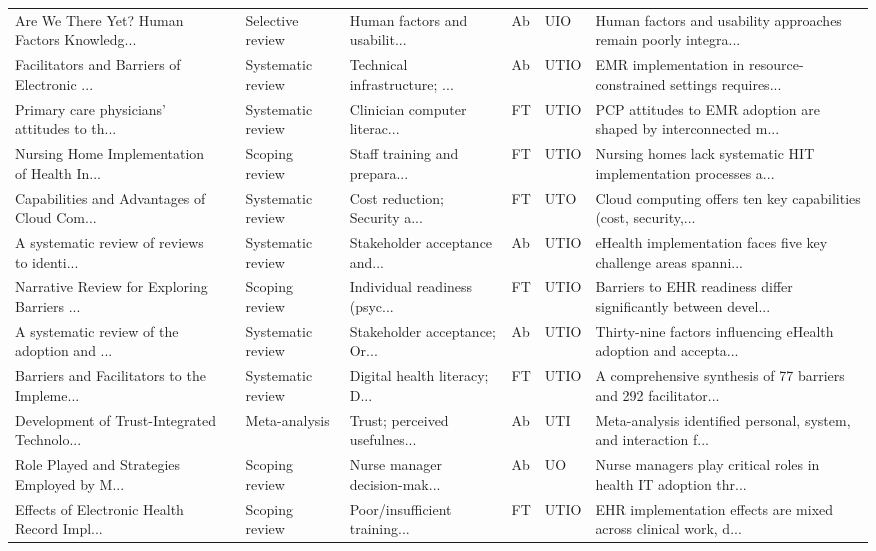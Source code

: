 \begin{longtable}{p{3.4cm} >{\centering\arraybackslash}p{0.7cm} p{1.9cm} p{2.4cm} >{\centering\arraybackslash}p{0.8cm} >{\centering\arraybackslash}p{1.1cm} p{3.4cm}}
Are We There Yet? Human Factors Knowledg... & 2017 & Selective review & Human factors and usabilit... & Ab & UIO & Human factors and usability approaches remain poorly integra... \\
Facilitators and Barriers of Electronic ... & 2018 & Systematic review & Technical infrastructure; ... & Ab & UTIO & EMR implementation in resource-constrained settings requires... \\
Primary care physicians' attitudes to th... & 2018 & Systematic review & Clinician computer literac... & FT & UTIO & PCP attitudes to EMR adoption are shaped by interconnected m... \\
Nursing Home Implementation of Health In... & 2018 & Scoping review & Staff training and prepara... & FT & UTIO & Nursing homes lack systematic HIT implementation processes a... \\
Capabilities and Advantages of Cloud Com... & 2018 & Systematic review & Cost reduction; Security a... & FT & UTO & Cloud computing offers ten key capabilities (cost, security,... \\
A systematic review of reviews to identi... & 2019 & Systematic review & Stakeholder acceptance and... & Ab & UTIO & eHealth implementation faces five key challenge areas spanni... \\
Narrative Review for Exploring Barriers ... & 2019 & Scoping review & Individual readiness (psyc... & FT & UTIO & Barriers to EHR readiness differ significantly between devel... \\
A systematic review of the adoption and ... & 2019 & Systematic review & Stakeholder acceptance; Or... & Ab & UTIO & Thirty-nine factors influencing eHealth adoption and accepta... \\
Barriers and Facilitators to the Impleme... & 2019 & Systematic review & Digital health literacy; D... & FT & UTIO & A comprehensive synthesis of 77 barriers and 292 facilitator... \\
Development of Trust-Integrated Technolo... & 2019 & Meta-analysis & Trust; perceived usefulnes... & Ab & UTI & Meta-analysis identified personal, system, and interaction f... \\
Role Played and Strategies Employed by M... & 2019 & Scoping review & Nurse manager decision-mak... & Ab & UO & Nurse managers play critical roles in health IT adoption thr... \\
Effects of Electronic Health Record Impl... & 2020 & Scoping review & Poor/insufficient training... & FT & UTIO & EHR implementation effects are mixed across clinical work, d... \\

\end{longtable}
